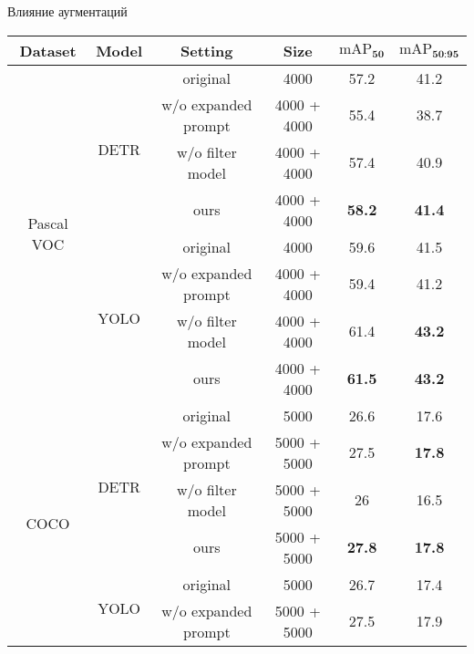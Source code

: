 \documentclass{beamer}
\begin{document}
\begin{frame}{Влияние аугментаций}

\begin{table}[p]
\centering
\scriptsize %
\setlength{\tabcolsep}{2pt} %
\renewcommand{\arraystretch}{0.9} %
\begin{tabular}{cccc|cc}
\toprule
\textbf{Dataset} & \textbf{Model} & \textbf{Setting} & \textbf{Size} & \textbf{$\text{mAP}_{\textbf{50}}$} & \textbf{$\text{mAP}_{\textbf{50:95}}$} \\
\midrule
\multirow{8}{*}{Pascal VOC} 
    & \multirow{4}{*}{DETR}
        & original                     & 4000  & 57.2 & 41.2 \\
        &                              & w/o expanded prompt          & 4000 + 4000  & 55.4 & 38.7 \\
        &                              & w/o filter model             & 4000 + 4000  & 57.4 & 40.9 \\
        &                              & ours                          & 4000 + 4000  & \textbf{58.2} & \textbf{41.4} \\
    \cline{2-6}
    & \multirow{4}{*}{YOLO}
        & original                     & 4000  & 59.6 & 41.5 \\
        &                              & w/o expanded prompt          & 4000 + 4000  & 59.4 & 41.2 \\
        &                              & w/o filter model             & 4000 + 4000  & 61.4 & \textbf{43.2} \\
        &                              & ours                          & 4000 + 4000  & \textbf{61.5} & \textbf{43.2} \\
\midrule
\multirow{8}{*}{COCO} 
    & \multirow{4}{*}{DETR}
        & original                     & 5000 & 26.6 & 17.6 \\
        &                              & w/o expanded prompt          & 5000 + 5000 & 27.5 & \textbf{17.8} \\
        &                              & w/o filter model             & 5000 + 5000 & 26 & 16.5 \\
        &                              & ours                          & 5000 + 5000 & \textbf{27.8} & \textbf{17.8} \\
    \cline{2-6}
    & \multirow{4}{*}{YOLO}
        & original                     & 5000 & 26.7 & 17.4 \\
        &                              & w/o expanded prompt          & 5000 + 5000 & 27.5 & 17.9 \\

\end{tabular}
\end{table}
\end{frame}
\end{document}
